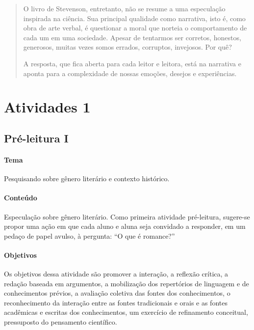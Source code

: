 \documentclass[12pt]{extarticle}
\begin{document}
\begin{abstract}
O livro de Stevenson, entretanto, não se resume a uma especulação
inspirada na ciência. Sua principal qualidade como narrativa, isto é,
como obra de arte verbal, é questionar a moral que norteia o
comportamento de cada um em uma sociedade. Apesar de tentarmos ser
corretos, honestos, generosos, muitas vezes somos errados, corruptos,
invejosos. Por quê?

A resposta, que fica aberta para cada leitor e leitora, está na
narrativa e aponta para a complexidade de nossas emoções, desejos e
experiências.
\end{abstract}

\tableofcontents


\section{Atividades 1}

\subsection{Pré-leitura I}

\bnccativividadespreleitura
{}

\paragraph{Tema} Pesquisando sobre gênero literário e contexto histórico.



\paragraph{Conteúdo} Especulação sobre gênero literário.
Como primeira atividade pré-leitura, sugere-se propor uma ação em que
cada aluno e aluna seja convidado a responder, em um pedaço de papel
avulso, à pergunta: ``O que é romance?''

\paragraph{Objetivos}
Os objetivos dessa atividade são promover a interação, a reflexão
crítica, a redação baseada em argumentos, a mobilização dos repertórios
de linguagem e de conhecimentos prévios, a avaliação coletiva das fontes
dos conhecimentos, o reconhecimento da interação entre as fontes
tradicionais e orais e as fontes acadêmicas e escritas dos
conhecimentos, um exercício de refinamento conceitual, pressuposto do
pensamento científico.
\end{document}
